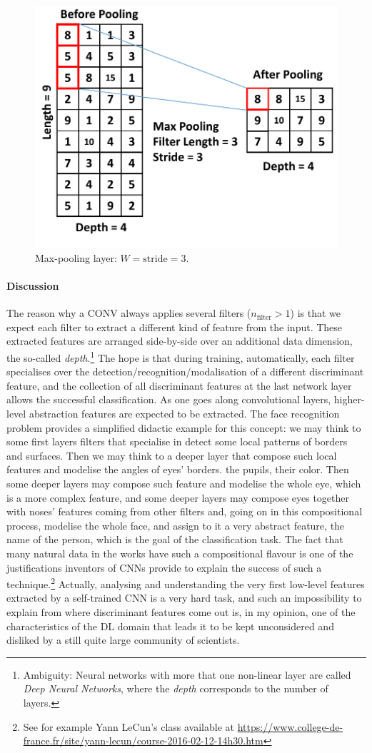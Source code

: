 \begin{figure}[t]
\centering
\includegraphics[width=.4\textwidth]{../Figures/CHES2017/max_pooling.pdf}
\caption{Max-pooling layer: $W = \mathrm{stride} = 3$. }\label{fig:pool_layer}
\end{figure}

\paragraph*{Discussion}
The reason why a CONV always applies several filters (\ie $n_{\text{filter}}>1$) is
that we expect each filter to extract a different kind of feature from
the input. These extracted features are arranged
side-by-side over an additional data dimension, the so-called
\emph{depth}.\footnote{Ambiguity: Neural networks with more that one non-linear layer are called
\emph{Deep Neural Networks}, where the \emph{depth} corresponds to the number of
layers.} The hope is that during training, automatically, each filter specialises over the detection/recognition/modalisation of a different discriminant feature, and the collection of all discriminant features at the last network layer allows the successful classification.  As one goes along convolutional layers, higher-level abstraction
features are expected to be extracted.  The face recognition problem provides a simplified didactic example for this concept: we may think to some first layers filters that specialise in detect some local patterns of borders and surfaces. Then we may think to a deeper layer that compose such local features and modelise the angles of eyes' borders. the pupils, their color. Then some deeper layers may compose such feature and modelise  the whole eye, which is a more complex feature, and some deeper layers may compose eyes together with noses' features coming from other filters and, going on in this compositional process, modelise the whole face, and assign to it a very abstract feature, \ie the name of the person, which is the goal of the classification task. The fact that many natural data in the works have such a compositional flavour is one of the justifications inventors of CNNs provide to explain the success of such a technique.\footnote{See for example Yann LeCun's class available at \url{https://www.college-de-france.fr/site/yann-lecun/course-2016-02-12-14h30.htm}}  Actually, analysing and understanding the very first low-level features extracted by a self-trained CNN is a very hard task, and such an impossibility to explain from where discriminant features come out is, in my opinion, one of the characteristics of the DL domain that leads it to be kept unconsidered and disliked by a still quite large community of scientists. 


